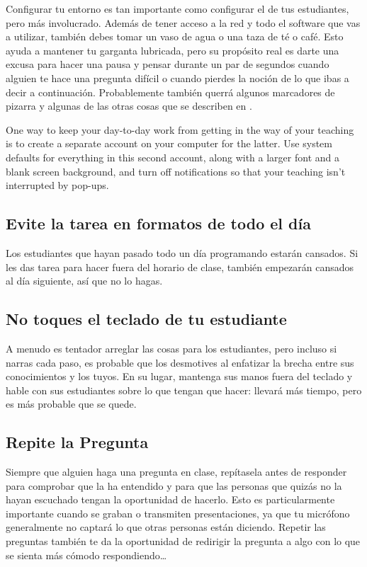 Configurar tu entorno es tan importante como configurar el de tus estudiantes,
pero más involucrado.
Además de tener acceso a la red y todo el software que vas a utilizar,
también debes tomar un vaso de agua
o una taza de té o café.
Esto ayuda a mantener tu garganta lubricada,
pero su propósito real es darte una excusa para hacer una pausa y pensar durante un par de segundos
cuando alguien te hace una pregunta difícil
o cuando pierdes la noción de lo que ibas a decir a continuación.
Probablemente también querrá algunos marcadores de pizarra
y algunas de las otras cosas que se describen en .

One way to keep your day-to-day work from getting in the way of your teaching
is to create a separate account on your computer for the latter.
Use system defaults for everything in this second account,
along with a larger font and a blank screen background,
and turn off notifications so that your teaching isn't interrupted by pop-ups.

\subsection*{Evite la tarea en formatos de todo el día}

Los estudiantes que hayan pasado todo un día programando estarán cansados.
Si les das tarea para hacer fuera del horario de clase,
también empezarán cansados al día siguiente,
así que no lo hagas.

\subsection*{No toques el teclado de tu estudiante}

A menudo es tentador arreglar las cosas para los estudiantes,
pero incluso si narras cada paso,
es probable que los desmotives
al enfatizar la brecha entre sus conocimientos y los tuyos.
En su lugar,
mantenga sus manos fuera del teclado y hable con sus estudiantes sobre lo que tengan que hacer:
llevará más tiempo,
pero es más probable que se quede.

\subsection*{Repite la Pregunta}

Siempre que alguien haga una pregunta en clase,
repítasela antes de responder
para comprobar que la ha entendido
y para que las personas que quizás no la hayan escuchado tengan la oportunidad de hacerlo.
Esto es particularmente importante cuando se graban o transmiten presentaciones,
ya que tu micrófono generalmente no captará lo que otras personas están diciendo. Repetir las preguntas también te da la oportunidad
de redirigir la pregunta a algo con lo que se sienta más cómodo respondiendo{\ldots}

